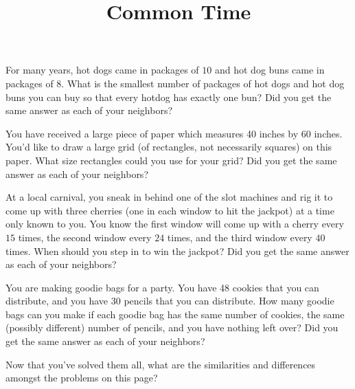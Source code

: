 \documentclass[nooutcomes, noauthor]{ximera}
\title{Common Time}
\begin{document}
\begin{abstract}
\end{abstract}
\maketitle

\begin{problem}
For many years, hot dogs came in packages of $10$ and hot dog buns came in packages of $8$. What is the smallest number of packages of hot dogs  and hot dog buns you can buy so that every hotdog has exactly one bun? Did you get the same answer as each of your neighbors?

\end{problem}


\begin{problem}
You have received a large piece of paper which measures 40 inches by 60 inches.  You'd like to draw a large grid (of rectangles, not necessarily squares) on this paper.  What size rectangles could you use for your grid?  Did you get the same answer as each of your neighbors?
\vfill
\end{problem}


\begin{problem}
At a local carnival, you sneak in behind one of the slot machines and rig it to come up with three cherries (one in each window to hit the jackpot) at a time only known to you.  You know the first window will come up with a cherry every $15$ times, the second window every $24$ times, and the third window every $40$ times.  When should you step in to win the jackpot?  Did you get the same answer as each of your neighbors?
\vfill
\end{problem}





\begin{problem}
You are making goodie bags for a party. You have 48 cookies that you can distribute, and you have 30 pencils that you can distribute. How many goodie bags can you make if each goodie bag has the same number of cookies, the same (possibly different) number of pencils, and you have nothing left over? Did you get the same answer as each of your neighbors?

\end{problem}


\begin{problem}
Now that you've solved them all, what are the similarities and differences amongst the problems on this page?
\end{problem}
\end{document}
